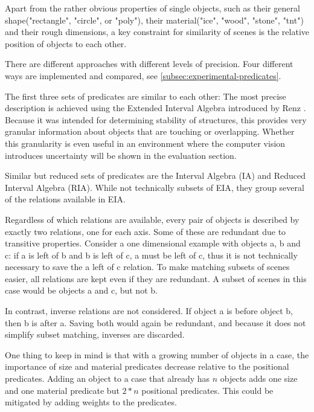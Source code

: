 Apart from the rather obvious properties of single objects, such as their general shape("rectangle", "circle", or "poly"), their material("ice", "wood", "stone", "tnt") and their rough dimensions, a key constraint for similarity of scenes is the relative position of objects to each other.

There are different approaches with different levels of precision. Four different ways are implemented and compared, see \ref{subsec:experimental-predicates}.

The first three sets of predicates are similar to each other:
The most precise description is achieved using the Extended Interval Algebra introduced by Renz \cite{Renz-ERA}. Because it was intended for determining stability of structures, this provides very granular information about objects that are touching or overlapping.
Whether this granularity is even useful in an environment where the computer vision introduces uncertainty will be shown in the evaluation section.

Similar but reduced sets of predicates are the Interval Algebra (IA) and Reduced Interval Algebra (RIA). While not technically subsets of EIA, they group several of the relations available in EIA.



Regardless of which relations are available, every pair of objects is described by exactly two relations, one for each axis. Some of these are redundant due to transitive properties.
Consider a one dimensional example with objects a, b and c: if a is left of b and b is left of c, a must be left of c, thus it is not technically necessary to save the a left of c relation.
To make matching subsets of scenes easier, all relations are kept even if they are redundant. A subset of scenes in this case would be objects a and c, but not b.

In contrast, inverse relations are not considered. If object a is before object b, then b is after a. Saving both would again be redundant, and because it does not simplify subset matching, inverses are discarded.

One thing to keep in mind is that with a growing number of objects in a case, the importance of size and material predicates decrease relative to the positional predicates. Adding an object to a case that already has $n$ objects adds one size and one material predicate but $2*n$ positional predicates. This could be mitigated by adding weights to the predicates.

